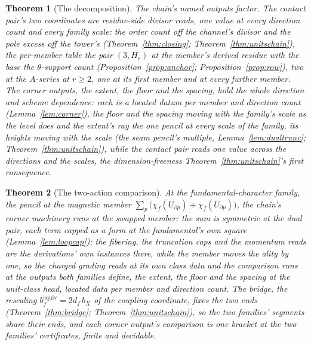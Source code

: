 \documentclass[11pt]{article}
\newtheorem{theorem}{Theorem}
\theoremstyle{definition}
\begin{document}
\begin{theorem}[The decomposition]\label{thm:decomp}
The chain's named outputs factor. The contact pair's two
coordinates are residue-side divisor reads, one value at every
direction count and every family scale: the order count off the
channel's divisor and the pole excess off the tower's
(Theorem~\ref{thm:closing}; Theorem~\ref{thm:unitschain}), the
per-member table the pair $(3,H_r)$ at the member's derived
residue with the base the $\theta$-support count
(Proposition~\ref{prop:anchor}; Proposition~\ref{prop:row}),
two at the $A$-series at $r\ge2$, one at its first member and
at every further member. The
corner outputs, the extent, the floor and the spacing, hold the
whole direction and scheme dependence: each is a located datum
per member and direction count
(Lemma~\ref{lem:corner}), the floor and the spacing moving with
the family's scale as the level does and the extent's ray the one
pencil at every scale of the family, its heights moving with the
scale (the seam pencil's multiple, Lemma~\ref{lem:dualtrunc};
Theorem~\ref{thm:unitschain}), while the contact pair reads one value
across the directions and the scales, the dimension-freeness
Theorem~\ref{thm:unitschain}'s first consequence.
\end{theorem}

\begin{theorem}[The two-action comparison]\label{thm:twoaction}
At the fundamental-character family, the pencil at the magnetic
member $\sum_p\big(\chi_f(U_{\partial p})
+\chi_{\bar f}(U_{\partial p})\big)$, the chain's corner
machinery runs at the swapped member: the sum is symmetric at
the dual pair, each term capped as a form at the fundamental's
own square (Lemma~\ref{lem:loopcap}); the fibering, the
truncation caps and the momentum reads are the derivations' own
instances there, while the member moves the ality by one, so the
charged grading reads at its own class data and the comparison
runs at the outputs both families define, the extent, the floor
and the spacing at the unit-class head, located data per
member and direction count. The bridge, the rescaling
$b_f^{\mathrm{equiv}}=2d_f\,b_X$ of the coupling coordinate, fixes
the two ends (Theorem~\ref{thm:bridge};
Theorem~\ref{thm:unitschain}), so the two families' segments share
their ends, and each corner output's
comparison is one bracket at the two families' certificates,
finite and decidable.
\end{theorem}
\end{document}
